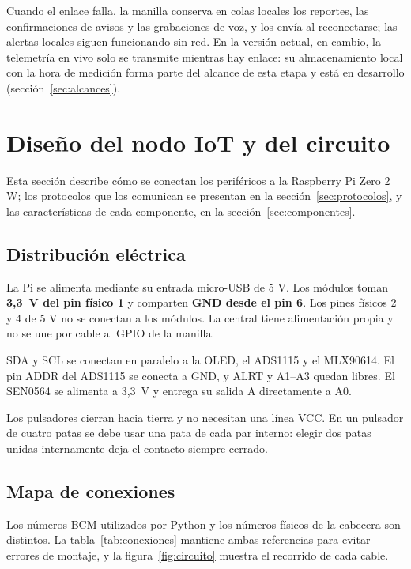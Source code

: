 \documentclass[10pt,a4paper]{article}
\newcommand{\newsection}[1]{\clearpage\section{#1}}
\begin{document}
Cuando el enlace falla, la manilla conserva en colas locales los reportes, las confirmaciones de avisos y las grabaciones de voz, y los envía al reconectarse; las alertas locales siguen funcionando sin red. En la versión actual, en cambio, la telemetría en vivo solo se transmite mientras hay enlace: su almacenamiento local con la hora de medición forma parte del alcance de esta etapa y está en desarrollo (sección~\ref{sec:alcances}).

\newsection{Diseño del nodo IoT y del circuito}
\label{sec:circuito}
Esta sección describe cómo se conectan los periféricos a la Raspberry Pi Zero 2 W; los protocolos que los comunican se presentan en la sección~\ref{sec:protocolos}, y las características de cada componente, en la sección~\ref{sec:componentes}.

\subsection{Distribución eléctrica}
La Pi se alimenta mediante su entrada micro-USB de 5 V. Los módulos toman \textbf{3,3~V del pin físico 1} y comparten \textbf{GND desde el pin 6}. Los pines físicos 2 y 4 de 5 V no se conectan a los módulos. La central tiene alimentación propia y no se une por cable al GPIO de la manilla.

SDA y SCL se conectan en paralelo a la OLED, el ADS1115 y el MLX90614. El pin ADDR del ADS1115 se conecta a GND, y ALRT y A1--A3 quedan libres. El SEN0564 se alimenta a 3,3~V y entrega su salida A directamente a A0.

Los pulsadores cierran hacia tierra y no necesitan una línea VCC. En un pulsador de cuatro patas se debe usar una pata de cada par interno: elegir dos patas unidas internamente deja el contacto siempre cerrado.

\clearpage
\subsection{Mapa de conexiones}
Los números BCM utilizados por Python y los números físicos de la cabecera son distintos. La tabla~\ref{tab:conexiones} mantiene ambas referencias para evitar errores de montaje, y la figura~\ref{fig:circuito} muestra el recorrido de cada cable.
\end{document}
